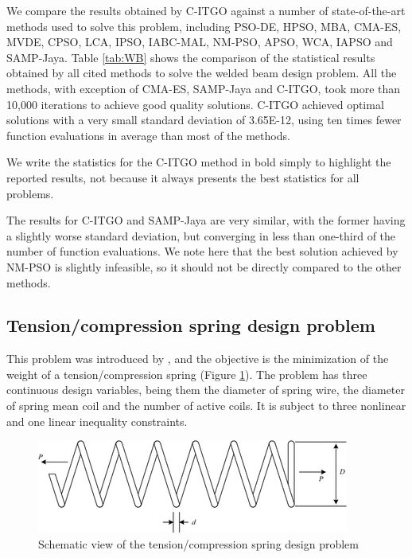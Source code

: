 We compare the results obtained by C-ITGO against a number of state-of-the-art methods used to solve this problem, including PSO-DE, HPSO, MBA, CMA-ES, MVDE, CPSO, LCA, IPSO, IABC-MAL, NM-PSO, APSO, WCA, IAPSO and SAMP-Jaya. Table \ref{tab:WB} shows the comparison of the statistical results obtained by all cited methods to solve the welded beam design problem. All the methods, with exception of CMA-ES, SAMP-Jaya and C-ITGO, took more than 10,000 iterations to achieve good quality solutions. C-ITGO achieved optimal solutions with a very small standard deviation of 3.65E-12, using ten times fewer function evaluations in average than most of the methods.

We write the statistics for the C-ITGO method in bold simply to highlight the reported results, not because it always presents the best statistics for all problems.



The results for C-ITGO and SAMP-Jaya are very similar, with the former having a slightly worse standard deviation, but converging in less than one-third of the number of function evaluations. We note here that the best solution achieved by NM-PSO is slightly infeasible, so it should not be directly compared to the other methods.




\subsection{Tension/compression spring design problem}

This problem was introduced by \cite{TC}, and the objective is the minimization of the weight of a tension/compression spring (Figure \ref{fig:TC}). The problem has three continuous design variables, being them the diameter of spring wire, the diameter of spring mean coil and the number of active coils. It is subject to three nonlinear and one linear inequality constraints.

\begin{figure}[h]
\begin{center}
\includegraphics[scale=0.6]{Imgs/TC.png}
\end{center}
\captionsetup{justification=centering}
\caption{Schematic view of the tension/compression spring design problem}\label{fig:TC}
\end{figure}


